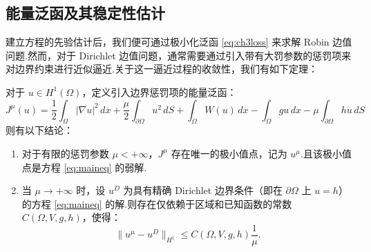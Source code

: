 \subsection{能量泛函及其稳定性估计}
建立方程的先验估计后，我们便可通过极小化泛函 \eqref{eq:ch3loss} 来求解 Robin 边值问题.然而，对于 Dirichlet 边值问题，通常需要通过引入带有大罚参数的惩罚项来对边界约束进行近似逼近.关于这一逼近过程的收敛性，我们有如下定理：
\begin{theorem}\label{thm:model}
对于 $u\in H^{1}(\Omega)$，定义引入边界惩罚项的能量泛函：
\begin{equation}\label{eq:ch3conloss}
J^{\mu}(u) = \frac{1}{2}\int_{\Omega} |\nabla u|^2 \, dx + \frac{\mu}{2}\int_{\partial \Omega} u^2 \, dS + \int_{\Omega} W(u) \, dx - \int_{\Omega} gu \, dx - \mu \int_{\partial \Omega} hu \, dS
\end{equation}
则有以下结论：
\begin{enumerate}
\item[(a)] 对于有限的惩罚参数 $\mu<+\infty$，$J^{\mu}$ 存在唯一的极小值点，记为 $u^{\mu}$.且该极小值点是方程 \eqref{eq:maineq} 的弱解.
\item[(b)] 当 $\mu \rightarrow +\infty$ 时，设 $u^{D}$ 为具有精确 Dirichlet 边界条件（即在 $\partial \Omega$ 上 $u=h$）的方程 \eqref{eq:maineq} 的解.则存在仅依赖于区域和已知函数的常数 $C(\Omega,V,g,h)$，使得：
\begin{equation*}
\|u^{\mu}-u^{D}\|_{H^{1}}\leq C(\Omega,V,g,h)\frac{1}{\mu}.
\end{equation*}
\end{enumerate}
\end{theorem}
